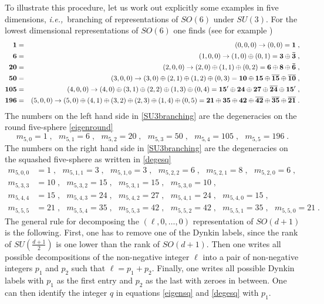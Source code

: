 \documentclass[12pt]{article}
\numberwithin{equation}{section}
\newcommand{\ie}{{\it i.e.,}\ }
\begin{document}
To illustrate this procedure, let us work out explicitly some examples in five dimensions, \ie branching of representations of $SO(6)$ under $SU(3)$. For the lowest dimensional representations of $SO(6)$ one finds (see for example \cite{Slansky:1981yr})
%
\begin{eqnarray}\label{SU3branching}
\mathbf{1} &=& (0,0,0) \to (0,0) = \mathbf{1}\;, \notag\\
\mathbf{6} &=& (1,0,0) \to (1,0)\oplus (0,1) = \mathbf{3}\oplus \mathbf{\bar{3}}\;, \notag\\
\mathbf{20} &=& (2,0,0) \to (2,0)\oplus(1,1)\oplus (0,2) = \mathbf{6}\oplus\mathbf{8}\oplus \mathbf{\bar{6}}\;, \\
\mathbf{50} &=& (3,0,0) \to (3,0)\oplus(2,1)\oplus (1,2)\oplus (0,3) = \mathbf{10}\oplus\mathbf{15}\oplus\mathbf{\overline{15}}\oplus \mathbf{\overline{10}}\;, \notag\\
\mathbf{105} &=& (4,0,0) \to (4,0)\oplus(3,1)\oplus(2,2)\oplus(1,3)\oplus (0,4) = \mathbf{15'}\oplus\mathbf{24}\oplus\mathbf{27}\oplus \mathbf{\overline{24}}\oplus \mathbf{15'}\;, \notag\\
\mathbf{196} &=& (5,0,0) \to (5,0)\oplus(4,1)\oplus(3,2)\oplus(2,3)\oplus(1,4)\oplus (0,5) = \mathbf{21}\oplus\mathbf{35}\oplus \mathbf{42}\oplus \mathbf{\overline{42}}\oplus \mathbf{\overline{35}}\oplus \mathbf{\overline{21}}\;.\notag
\end{eqnarray}
%
The numbers on the left hand side in \eqref{SU3branching} are the degeneracies on the round five-sphere \eqref{eigenround}
%
\begin{equation}
m_{5,0} = 1\;, ~~~ m_{5,1} = 6\;, ~~~ m_{5,2} = 20\;, ~~~ m_{5,3} = 50\;, ~~~ m_{5,4} = 105\;, ~~~ m_{5,5} = 196\;.
\end{equation}
%
The numbers on the right hand side in \eqref{SU3branching} are the degeneracies on the squashed five-sphere as written in \eqref{degesq}
%
\begin{equation}
\begin{split}
m_{5,0,0} &= 1\;, ~~~ m_{5,1,1} = 3\;, ~~~ m_{5,1,0} = 3\;, ~~~ m_{5,2,2} = 6\;, ~~~ m_{5,2,1} = 8\;, ~~~ m_{5,2,0} = 6\;,\\
m_{5,3,3} &= 10\;, ~~~ m_{5,3,2} = 15\;, ~~~ m_{5,3,1} = 15\;, ~~~ m_{5,3,0} = 10\;, \\
m_{5,4,4} &= 15\;, ~~~ m_{5,4,3} = 24\;, ~~~ m_{5,4,2} = 27\;, ~~~ m_{5,4,1} = 24\;,~~~ m_{5,4,0} = 15\;, \\
m_{5,5,5} &= 21\;, ~~~ m_{5,5,4} = 35\;, ~~~ m_{5,5,3} = 42\;, ~~~ m_{5,5,2} = 42\;,~~~ m_{5,5,1} = 35\;, ~~~ m_{5,5,0} = 21\;.
\end{split}
\end{equation}
%
The general rule for decomposing the $(\ell,0,\ldots,0)$ representation of $SO(d+1)$ is the following. First, one has to remove one of the Dynkin labels, since the rank of $SU(\frac{d+1}{2})$ is one lower than the rank of $SO(d+1)$. Then one writes all possible decompositions of the non-negative integer $\ell$ into a pair of non-negative integers $p_1$ and $p_2$ such that $\ell=p_1+p_2$. Finally, one writes all possible Dynkin labels with $p_1$ as the first entry and $p_2$ as the last with zeroes in between. One can then identify the integer $q$ in equations \eqref{eigensq} and \eqref{degesq} with $p_1$.
\end{document}
